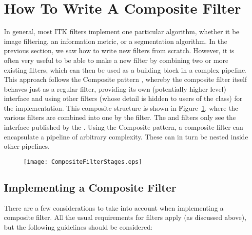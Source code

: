 
\section{How To Write A Composite Filter}

In general, most ITK filters implement one particular algorithm, whether it be
image filtering, an information metric, or a segmentation algorithm.  In the
previous section, we saw how to write new filters from scratch.  However, it is
often very useful to be able to make a new filter by combining two or more
existing filters, which can then be used as a building block in a complex
pipeline.  This approach follows the Composite pattern \cite{Gamma1995},
whereby the composite filter itself behaves just as a regular filter, providing
its own (potentially higher level) interface and using other filters (whose
detail is hidden to users of the class) for the implementation.  This composite
structure is shown in Figure~\ref{fig:CompositeFilterStages}, where the various
 filters are combined into one by the  filter.
The  and  filters only see the interface published by
the .  Using the Composite pattern, a composite filter can
encapsulate a pipeline of arbitrary complexity.  These can in turn be nested
inside other pipelines.

\begin{figure}
  \centering
  \texttt{[image: CompositeFilterStages.eps]}
  \label{fig:CompositeFilterStages}
\end{figure}

\subsection{Implementing a Composite Filter}

There are a few considerations to take into account when implementing a
composite filter.  All the usual requirements for filters apply (as
discussed above), but the following guidelines should be considered:

